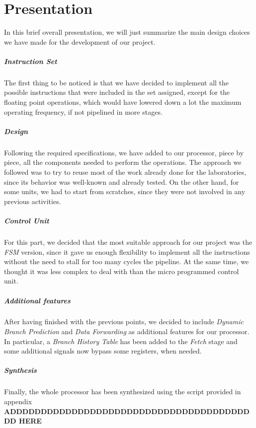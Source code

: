 \chapter{Presentation}
\label{chap_intro}

In this brief overall presentation, we will just summarize the main design choices we have made for the development of our project. 

\paragraph{Instruction Set}
The first thing to be noticed is that we have decided to implement all the possible instructions that were included in the set assigned, except for the floating point operations, which would have lowered down a lot the maximum operating frequency, if not pipelined in more stages.

\paragraph{Design}
Following the required specifications, we have added to our processor, piece by piece, all the components needed to perform the operations. The approach we followed was to try to reuse most of the work already done for the laboratories, since its behavior was well-known and already tested. On the other hand, for some units, we had to start from scratches, since they were not involved in any previous activities.

\paragraph{Control Unit}
For this part, we decided that the most suitable approach for our project was the \textit{FSM} version, since it gave us enough flexibility to implement all the instructions without the need to stall for too many cycles the pipeline. At the same time, we thought it was less complex to deal with than the micro programmed control unit.

\paragraph{Additional features}
After having finished with the previous points, we decided to include \textit{Dynamic Branch Prediction} and \textit{Data Forwarding} as additional features for our processor. In particular, a \textit{Branch History Table} has been added to the \textit{Fetch} stage and some additional signals now bypass some registers, when needed.

\paragraph{Synthesis}
Finally, the whole processor has been synthesized using the script provided in appendix \textbf{ADDDDDDDDDDDDDDDDDDDDDDDDDDDDDDDDDDDDDDDDD HERE}
